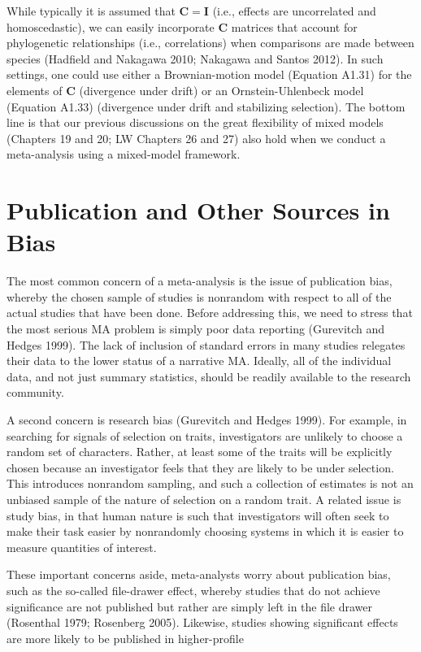 \documentclass{article}
\begin{document}
While typically it is assumed that  $ \mathbf{C} = \mathbf{I} $ (i.e., effects are uncorrelated and homoscedastic), we can easily incorporate  $ \mathbf{C} $ matrices that account for phylogenetic relationships (i.e., correlations) when comparisons are made between species (Hadfield and Nakagawa 2010; Nakagawa and Santos 2012). In such settings, one could use either a Brownian-motion model (Equation A1.31) for the elements of  $ \mathbf{C} $ (divergence under drift) or an Ornstein-Uhlenbeck model (Equation A1.33) (divergence under drift and stabilizing selection). The bottom line is that our previous discussions on the great flexibility of mixed models (Chapters 19 and 20; LW Chapters 26 and 27) also hold when we conduct a meta-analysis using a mixed-model framework.

\section{Publication and Other Sources in Bias}
The most common concern of a meta-analysis is the issue of publication bias, whereby the chosen sample of studies is nonrandom with respect to all of the actual studies that have been done. Before addressing this, we need to stress that the most serious MA problem is simply poor data reporting (Gurevitch and Hedges 1999). The lack of inclusion of standard errors in many studies relegates their data to the lower status of a narrative MA. Ideally, all of the individual data, and not just summary statistics, should be readily available to the research community.

A second concern is research bias (Gurevitch and Hedges 1999). For example, in searching for signals of selection on traits, investigators are unlikely to choose a random set of characters. Rather, at least some of the traits will be explicitly chosen because an investigator feels that they are likely to be under selection. This introduces nonrandom sampling, and such a collection of estimates is not an unbiased sample of the nature of selection on a random trait. A related issue is study bias, in that human nature is such that investigators will often seek to make their task easier by nonrandomly choosing systems in which it is easier to measure quantities of interest.

These important concerns aside, meta-analysts worry about publication bias, such as the so-called file-drawer effect, whereby studies that do not achieve significance are not published but rather are simply left in the file drawer (Rosenthal 1979; Rosenberg 2005). Likewise, studies showing significant effects are more likely to be published in higher-profile
\end{document}
